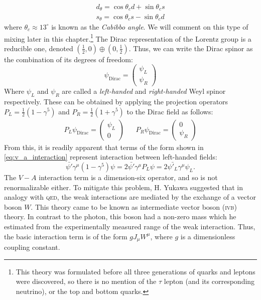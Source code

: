   \begin{equation}
    \begin{split}
    d_\theta = \cos\theta_c d + \sin\theta_c s\\
    s_\theta = \cos\theta_c s - \sin\theta_c d
  \end{split}
  \end{equation}
  where $\theta_c \approx 13^\circ$ is known as the \emph{Cabibbo angle}. We will comment on this type of mixing later in this chapter.\footnote{This theory was formulated before all three generations of quarks and leptons were discovered, so there is no mention of the $\tau$ lepton (and its corresponding neutrino), or the top and bottom quarks.}
  The Dirac representation of the Lorentz group is a reducible one, denoted $\left(\frac{1}{2},0\right)\oplus\left(0,\frac{1}{2}\right)$. Thus, we can write the Dirac spinor as the combination of its degrees of freedom:
\begin{equation}
  \psi_\text{Dirac} = \begin{pmatrix}\psi_L\\\psi_R\end{pmatrix} 
\end{equation}
Where $\psi_L$ and $\psi_R$ are called a \emph{left-handed} and \emph{right-handed} Weyl spinor respectively. These can be obtained by applying the projection operators $P_L = \frac{1}{2}(1-\gamma^5)$ and $P_R = \frac{1}{2}(1+\gamma^5)$  
to the Dirac field as follows:
\begin{align}
  P_L\psi_\text{Dirac} =
 \begin{pmatrix}
    \psi_L\\0
  \end{pmatrix}
  && 
  P_R\psi_\text{Dirac} = 
  \begin{pmatrix}
    0\\\psi_R
  \end{pmatrix}
\end{align}
From this, it is readily apparent that terms of the form shown in \eqref{eq:v_a_interaction} represent interaction between left-handed fields:
\begin{equation}
\bar{\psi'}\gamma^\mu(1-\gamma^5)\psi = 2\bar{\psi'}\gamma^\mu P_L\psi = 2\bar{\psi'_L}\gamma^\mu\psi _L.
\end{equation}
The $V-A$ interaction term is a dimension-six operator, and so is not renormalizable either. To mitigate this problem, H. Yukawa suggested \citep{Yukawa:1935xg} that in analogy with \textsc{qed}, the weak interactions are mediated by the exchange of a vector boson $W$. This theory came to be known as intermediate vector boson (\textsc{ivb}) theory. In contrast to the photon, this boson had a non-zero mass which he estimated from the experimentally measured range of the weak interaction. Thus, the basic interaction term is of the form $gJ_\mu W^\mu$, where $g$ is a dimensionless coupling constant. 
